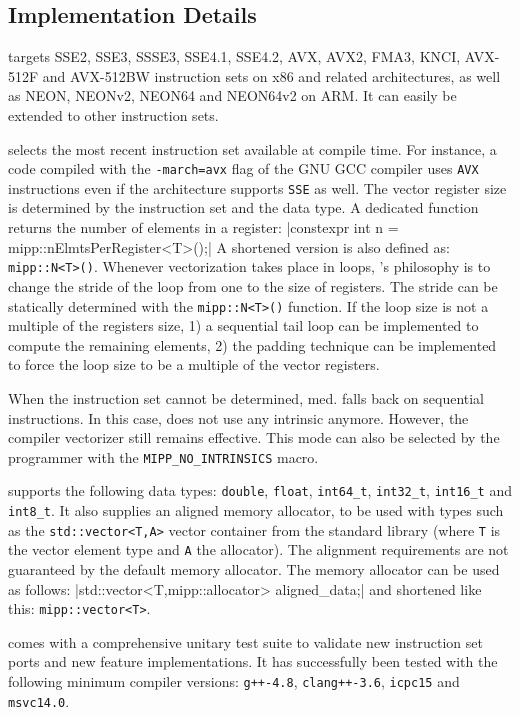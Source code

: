 \subsection{Implementation Details}
\label{sec:vec_mipp_implem}

\MIPP targets SSE2, SSE3, SSSE3, SSE4.1, SSE4.2, AVX, AVX2, FMA3, KNCI, AVX-512F
and AVX-512BW instruction sets on x86 and related architectures, as well as
NEON, NEONv2, NEON64 and NEON64v2 on ARM\R. It can easily be extended to other
instruction sets.

\MIPP selects the most recent instruction set available at compile time. For
instance, a code compiled with the \verb|-march=avx| flag of the GNU GCC
compiler uses \verb|AVX| instructions even if the architecture supports
\verb|SSE| as well. The vector register size is determined by the instruction
set and the data type. A dedicated function returns the number of elements in a
\MIPP register:
|constexpr int n = mipp::nElmtsPerRegister<T>();|
A shortened version is also defined as: \verb|mipp::N<T>()|. Whenever
vectorization takes place in loops, \MIPP's philosophy is to change the stride
of the loop from one to the size of registers. The stride can be statically
determined with the \verb|mipp::N<T>()| function.
If the loop size is not a multiple of the registers size, 1) a sequential tail
loop can be implemented to compute the remaining elements, 2) the padding
technique can be implemented to force the loop size to be a multiple of the
vector registers.

When the instruction set cannot be determined, \MIPP med. falls back on
sequential instructions. In this case, \MIPP does not use any intrinsic anymore.
However, the compiler vectorizer still remains effective. This mode can also be
selected by the programmer with the \verb|MIPP_NO_INTRINSICS| macro.

\MIPP supports the following data types: \verb|double|, \verb|float|,
\verb|int64_t|, \verb|int32_t|, \verb|int16_t| and \verb|int8_t|. It also
supplies an aligned memory allocator, to be used with types such as the
\verb|std::vector<T,A>| vector container from the \Cxx standard library (where
\verb|T| is the vector element type and \verb|A| the allocator). The alignment
requirements are not guaranteed by the default \Cxx memory allocator. The \MIPP
memory allocator can be used as follows:
|std::vector<T,mipp::allocator> aligned_data;|
and shortened like this: \verb|mipp::vector<T>|.

\MIPP comes with a comprehensive unitary test suite to validate new instruction
set ports and new feature implementations. It has successfully been tested with
the following minimum compiler versions: \verb|g++-4.8|, \verb|clang++-3.6|,
\verb|icpc15| and \verb|msvc14.0|.

